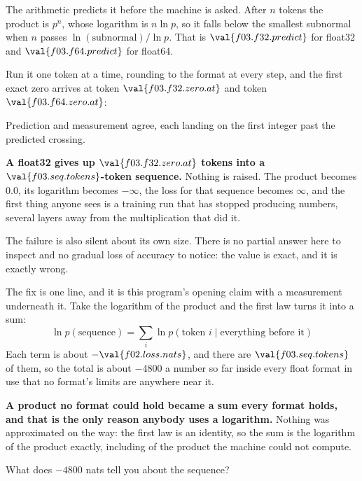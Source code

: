 \begin{fr}
\begin{ansblock}
The arithmetic predicts it before the machine is asked. After $n$ tokens the
product is $p^{n}$, whose logarithm is $n \ln p$, so it falls below the
smallest subnormal when $n$ passes $\ln(\text{subnormal}) / \ln p$. That is
$\val{f03.f32.predict}$ for float32 and $\val{f03.f64.predict}$ for float64.

Run it one token at a time, rounding to the format at every step, and the first
exact zero arrives at token $\val{f03.f32.zero.at}$ and token
$\val{f03.f64.zero.at}$:
\end{ansblock}


\noindent
Prediction and measurement agree, each landing on the first integer past the
predicted crossing.

\begin{warning}
\textbf{A float32 gives up $\val{f03.f32.zero.at}$ tokens into a
$\val{f03.seq.tokens}$-token sequence.} Nothing is raised. The product becomes
$\num{0.0}$, its logarithm becomes $-\infty$, the loss for that sequence
becomes $\infty$, and the first thing anyone sees is a training run that has
stopped producing numbers, several layers away from the multiplication that
did it.

The failure is also silent about its own size. There is no partial answer here
to inspect and no gradual loss of accuracy to notice: the value is exact, and
it is exactly wrong.
\end{warning}
\end{fr}

\begin{fr}
The fix is one line, and it is this program's opening claim with a measurement
underneath it. Take the logarithm of the product and the first law turns it
into a sum:
\[ \ln p(\text{sequence})
   = \sum_{i} \ln p(\text{token } i \mid \text{everything before it}) \]
Each term is about $-\val{f02.loss.nats}$, and there are
$\val{f03.seq.tokens}$ of them, so the total is about $-4800$ \dash{} a number
so far inside every float format in use that no format's limits are anywhere
near it.

\textbf{A product no format could hold became a sum every format holds, and
that is the only reason anybody uses a logarithm.} Nothing was approximated on
the way: the first law is an identity, so the sum is the logarithm of the
product exactly, including of the product the machine could not compute.

What does $-4800$ nats tell you about the sequence?
\nextframe
\end{fr}

